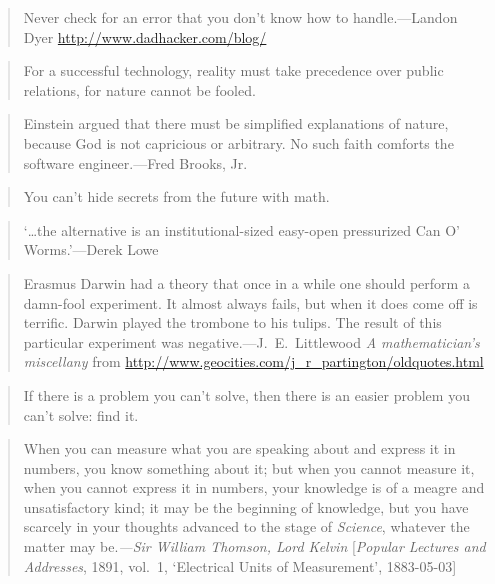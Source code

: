 \documentclass[a4paper]{article}
\begin{document}
\medskip
\begin{quote}
	Never check for an error that you don't know how to handle.---Landon
	Dyer \url{http://www.dadhacker.com/blog/}
\end{quote}

\medskip
\begin{quote}
	For a successful technology, reality must take precedence over public
	relations, for nature cannot be fooled.~\cite{Feynman1986}
\end{quote}

\medskip
\begin{quote}
	Einstein argued that there must be simplified explanations of nature, because
	God is not capricious or arbitrary.  No such faith comforts the software
	engineer.---Fred Brooks, Jr.~\cite{Brooks1987}
\end{quote}

\medskip
\begin{quote}
	You can't hide secrets from the future with math.~\cite{MCFrontalot2007}
\end{quote}

\medskip
\begin{quote}
	`\ldots the alternative is an institutional-sized easy-open
	pressurized Can O' Worms.'---Derek Lowe~\cite{Lowe2005}
\end{quote}

\medskip
\begin{quote}
	Erasmus Darwin had a theory that once in a while one should perform a
	damn-fool experiment. It almost always fails, but when it does come off
	is terrific.  Darwin played the trombone to his tulips. The result of
	this particular experiment was negative.---J.~E.~Littlewood \emph{A
	mathematician's miscellany} from
	\url{http://www.geocities.com/j_r_partington/oldquotes.html}
\end{quote}

\medskip
\begin{quote}
	If there is a problem you can't solve, then there is an easier problem
	you can't solve: find it.~\cite{Polya1990}
\end{quote}

\medskip
\begin{quote}
	When you can measure what you are speaking about and express it in numbers,
	you know something about it; but when you cannot measure it, when you cannot
	express it in numbers, your knowledge is of a meagre and unsatisfactory kind;
	it may be the beginning of knowledge, but you have scarcely in your thoughts
	advanced to the stage of \emph{Science}, whatever the matter may be.\emph{---Sir
	William Thomson, Lord Kelvin} [\emph{Popular Lectures and Addresses}, 1891,
	vol.~1, `Electrical Units of Measurement', 1883-05-03]~\cite{Zapato2007}
\end{quote}
\end{document}
